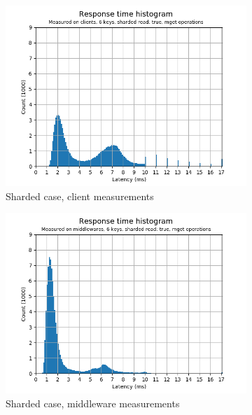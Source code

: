 \documentclass[11pt,a4paper]{article}
\begin{document}
\begin{figure}[h]
\begin{subfigure}{.5\textwidth}
  \centering
  \includegraphics[width=1.0\linewidth ,trim={0 0 0 0},clip]{img/plot/gmg-hist6-true-mget_clients.png}
  \caption{Sharded case, client measurements}
  \label{fig:gmg-hist6-true-mget_clients}
\end{subfigure}%
\begin{subfigure}{.5\textwidth}
  \centering
  \includegraphics[width=1.0\linewidth ,trim={0 0 0 0},clip]{img/plot/gmg-hist6-true-mget_middlewares.png}
  \caption{Sharded case, middleware measurements}
  \label{fig:gmg-hist6-true-mget_middlewares}
\end{subfigure}
\begin{subfigure}{.5\textwidth}

\end{subfigure}
\end{figure}
\end{document}
